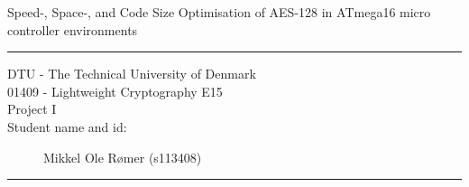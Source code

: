 \documentclass[11pt]{article}
\begin{document}
\begin{center}
{{\Large \sc Speed-, Space-, and Code Size Optimisation of AES-128 in ATmega16 micro controller environments}}
\end{center}
\rule{\textwidth}{1pt}
\begin{description}
\item[DTU - The Technical University of Denmark]
\item[01409 - Lightweight Cryptography E15]
\item[Project I]
\item[Student name and id:] Mikkel Ole Rømer (s113408)
\end{description}
\rule{\textwidth}{1pt}


\FloatBarrier


\FloatBarrier


\FloatBarrier


\FloatBarrier
\end{document}
